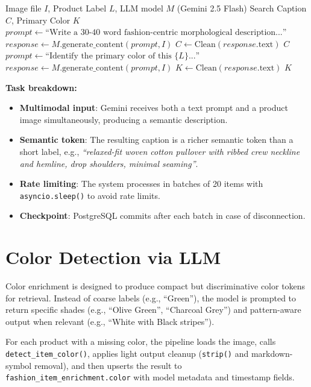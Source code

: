 \begin{algorithm}[H]
\caption{Multimodal Caption and Color Enrichment via LLM}\label{alg:llm_enrichment}
\begin{algorithmic}[1]
\Require Image file $I$, Product Label $L$, LLM model $M$ (Gemini 2.5 Flash)
\Ensure Search Caption $C$, Primary Color $K$
    \State $prompt \gets \text{``Write a 30-40 word fashion-centric morphological description...''}$
    \State $response \gets M.\text{generate\_content}(prompt, I)$
    \State $C \gets \text{Clean}(response.\text{text})$
    \State \Return $C$
\EndFunction
\State
{}
    \State $prompt \gets \text{``Identify the primary color of this \{}L\text{\}...''}$
    \State $response \gets M.\text{generate\_content}(prompt, I)$
    \State $K \gets \text{Clean}(response.\text{text})$
    \State \Return $K$
\EndFunction
\end{algorithmic}
\end{algorithm}

\textbf{Task breakdown:}
\begin{itemize}
    \item \textbf{Multimodal input}: Gemini receives both a text prompt and a product image simultaneously, producing a semantic description.
    \item \textbf{Semantic token}: The resulting caption is a richer semantic token than a short label, e.g., \textit{``relaxed-fit woven cotton pullover with ribbed crew neckline and hemline, drop shoulders, minimal seaming''}.
    \item \textbf{Rate limiting}: The system processes in batches of 20 items with \texttt{asyncio.sleep()} to avoid rate limits.
    \item \textbf{Checkpoint}: PostgreSQL commits after each batch in case of disconnection.
\end{itemize}

\section{Color Detection via LLM}
Color enrichment is designed to produce compact but discriminative color tokens for retrieval. Instead of coarse labels (e.g., ``Green''), the model is prompted to return specific shades (e.g., ``Olive Green'', ``Charcoal Grey'') and pattern-aware output when relevant (e.g., ``White with Black stripes'').

\begin{tcolorbox}[title=Method: Color Enrichment for Retrieval]
For each product with a missing color, the pipeline loads the image, calls \texttt{detect\_item\_color()}, applies light output cleanup (\texttt{strip()} and markdown-symbol removal), and then upserts the result to \texttt{fashion\_item\_enrichment.color} with model metadata and timestamp fields.
\end{tcolorbox}


